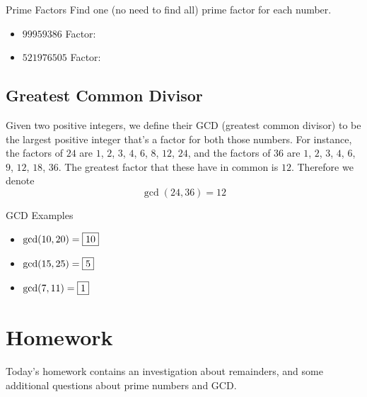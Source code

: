 \documentclass[a4paper,10pt]{report}
\begin{document}
\begin{problem}{Prime Factors}
 Find one (no need to find all) prime factor for each number.

 \begin{itemize}
  \item $99959386$ \hfill Factor: 
  \item $521976505$ \hfill Factor: 
 \end{itemize}
\end{problem}

\subsection{Greatest Common Divisor}
Given two positive integers, we define their GCD (greatest common divisor) to be
the largest positive integer that's a factor for both those numbers. For
instance, the factors of $24$ are $1$, $2$, $3$, $4$, $6$, $8$, $12$, $24$, and
the factors of $36$ are $1$, $2$, $3$, $4$, $6$, $9$, $12$, $18$, $36$. The
greatest factor that these have in common is $12$. Therefore we denote \[
 \gcd(24, 36) = 12
\]

\begin{problem}{GCD Examples}
 \begin{itemize}
  \item $\gcd(10, 20) = \Ans{10}$
  \item $\gcd(15, 25) = \Ans{5}$
  \item $\gcd(7, 11) = \Ans{1}$
 \end{itemize}
\end{problem}

\section{Homework}
Today's homework contains an investigation about remainders, and some additional
questions about prime numbers and GCD.
\end{document}
